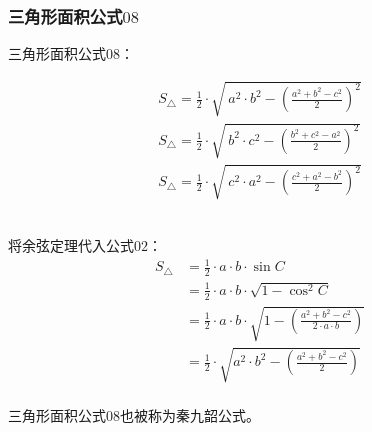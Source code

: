 \documentclass[UTF8]{ctexart}
\begin{document}
\subsubsection{三角形面积公式$08$}
    三角形面积公式$08$：
    \begin{large}
        \begin{align*}
            S_{\triangle}=\frac{1}{2}\cdot\sqrt{~a^2\cdot b^2-\left(\frac{a^2+b^2-c^2}{2}\right)^2}\\[4mm]
            S_{\triangle}=\frac{1}{2}\cdot\sqrt{~b^2\cdot c^2-\left(\frac{b^2+c^2-a^2}{2}\right)^2}\\[4mm]
            S_{\triangle}=\frac{1}{2}\cdot\sqrt{~c^2\cdot a^2-\left(\frac{c^2+a^2-b^2}{2}\right)^2}
        \end{align*}
    \end{large}\\
    将余弦定理代入公式$02$：
    \setcounter{equation}{0}
    \begin{align}
        S_{\triangle}
        &=\frac{1}{2}\cdot a\cdot b\cdot\sin{C}\\[3mm]
        &=\frac{1}{2}\cdot a\cdot b\cdot\sqrt{1-\cos^2{C}}\\[3mm]
        &=\frac{1}{2}\cdot a\cdot b\cdot\sqrt{1-\left(\frac{a^2+b^2-c^2}{2\cdot a\cdot b}\right)}\\[3mm]
        &=\frac{1}{2}\cdot\sqrt{a^2\cdot b^2 -\left(\frac{a^2+b^2-c^2}{2}\right)}
    \end{align}\\
    三角形面积公式$08$也被称为秦九韶公式。
\end{document}

